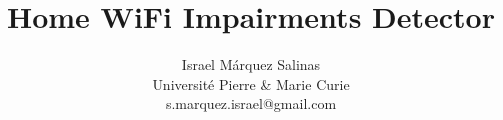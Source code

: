 \documentclass[sigconf]{Template}
\begin{document}
\title{Home WiFi Impairments Detector}
\author{Israel M\'{a}rquez Salinas \\Universit\'{e} Pierre \& Marie Curie \\s.marquez.israel@gmail.com}
\maketitle











\end{document}
